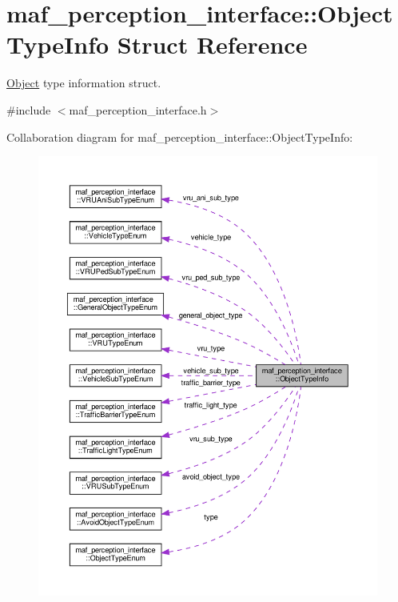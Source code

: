 \hypertarget{structmaf__perception__interface_1_1ObjectTypeInfo}{}\section{maf\+\_\+perception\+\_\+interface\+:\+:Object\+Type\+Info Struct Reference}
\label{structmaf__perception__interface_1_1ObjectTypeInfo}


\hyperlink{structmaf__perception__interface_1_1Object}{Object} type information struct.  




{\ttfamily \#include $<$maf\+\_\+perception\+\_\+interface.\+h$>$}



Collaboration diagram for maf\+\_\+perception\+\_\+interface\+:\+:Object\+Type\+Info\+:\nopagebreak
\begin{figure}[H]
\begin{center}
\leavevmode
\includegraphics[width=350pt]{structmaf__perception__interface_1_1ObjectTypeInfo__coll__graph}
\end{center}
\end{figure}
